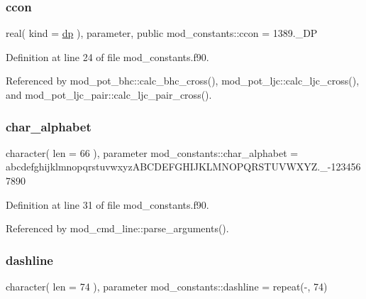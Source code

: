 \subsubsection{\texorpdfstring{ccon}{ccon}}
{\footnotesize\ttfamily real( kind = \hyperlink{namespacemod__constants_ac7aeda7f1802c4ef2a4780773c028214}{dp} ), parameter, public mod\+\_\+constants\+::ccon = 1389.\+\_\+\+DP}



Definition at line 24 of file mod\+\_\+constants.\+f90.



Referenced by mod\+\_\+pot\+\_\+bhc\+::calc\+\_\+bhc\+\_\+cross(), mod\+\_\+pot\+\_\+ljc\+::calc\+\_\+ljc\+\_\+cross(), and mod\+\_\+pot\+\_\+ljc\+\_\+pair\+::calc\+\_\+ljc\+\_\+pair\+\_\+cross().

\mbox{\label{namespacemod__constants_a1d9e53f57f87f727d4dd13f1dd4b8e45}} 
\subsubsection{\texorpdfstring{char\+\_\+alphabet}{char\_alphabet}}
{\footnotesize\ttfamily character( len = 66 ), parameter mod\+\_\+constants\+::char\+\_\+alphabet = \textquotesingle{}abcdefghijklmnopqrstuvwxyz\+A\+B\+C\+D\+E\+F\+G\+H\+I\+J\+K\+L\+M\+N\+O\+P\+Q\+R\+S\+T\+U\+V\+W\+X\+Y\+Z.\+\_\+-\/1234567890 \textquotesingle{}}



Definition at line 31 of file mod\+\_\+constants.\+f90.



Referenced by mod\+\_\+cmd\+\_\+line\+::parse\+\_\+arguments().

\mbox{\label{namespacemod__constants_ab55dac3c52ff6b1034697c6e83ac76d8}} 
\subsubsection{\texorpdfstring{dashline}{dashline}}
{\footnotesize\ttfamily character( len = 74 ), parameter mod\+\_\+constants\+::dashline = repeat(\textquotesingle{}-\/\textquotesingle{}, 74)}



